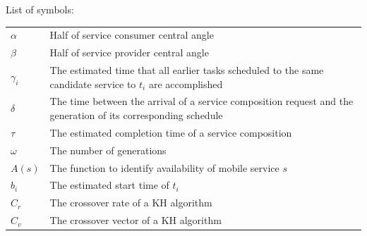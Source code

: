 \documentclass[journal]{IEEEtran}
\begin{document}
\noindent List of symbols: 

\noindent
\begin{tabular}{@{} l p{7.36cm} }
$\alpha$      &   Half of service consumer central angle \\
$\beta$       &   Half of service provider central angle \\
$\gamma_{i}$  &   The estimated time that all earlier tasks scheduled to the same candidate service to $t_i$ are accomplished  \\
$\delta$      &   The time between the arrival of a service composition request and the generation of its corresponding schedule \\
$\tau$        &   The estimated completion time of a service composition \\
$\omega$      &   The number of generations \\
$A(s)$        &   The function to identify availability of mobile service $s$ \\
$b_i$         &   The estimated start time of $t_i$ \\
$C_{r}$       &   The crossover rate of a KH algorithm \\
$C_{v}$       &   The crossover vector of a KH algorithm \\
\end{tabular}
\end{document}
